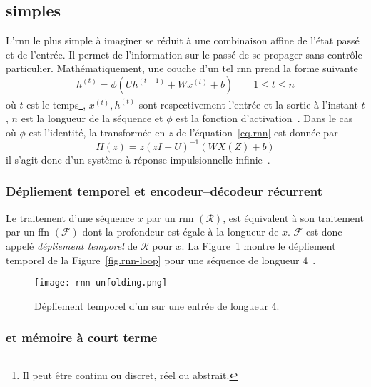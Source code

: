 \subsection{ simples}

L'\gls{rnn} le plus simple à imaginer se réduit à une combinaison affine de l'état passé et de l'entrée.
Il permet de l'information sur le passé de se propager sans contrôle particulier.
Mathématiquement, une couche d'un tel \gls{rnn} prend la forme suivante
\begin{equation}
    \label{eq.rnn}
    h^{(t)} = \phi\left(Uh^{(t-1)} + Wx^{(t)} + b\right) \qquad 1 \le t \le n
\end{equation}
où \(t\) est le temps\footnote{Il peut être continu ou discret, réel ou abstrait.},
\(x^{(t)}, h^{(t)}\) sont respectivement l'entrée et la sortie à l'instant \(t\), 
\(n\) est la longueur de la séquence et \(\phi\) est la fonction d'activation~\cite{Fathi_2021}.
Dans le cas où \(\phi\) est l'identité,  
la transformée en \(z\) de l'équation~\ref{eq.rnn} est donnée par 
\begin{equation}
    \label{eq.rnn-tz}
    H(z) = z\left(zI - U\right)^{-1} \left(WX(Z) + b\right)
\end{equation}
il s'agit donc d'un système à réponse impulsionnelle infinie~\cite{Fathi_2021}.

\subsubsection{Dépliement temporel et encodeur--décodeur récurrent}

Le traitement d'une séquence \(x\) par un \gls{rnn} \((\mathcal{R})\), 
est équivalent à son traitement par un \gls{ffn} \((\mathcal{F})\) dont la profondeur est égale à la longueur de \(x\).
\(\mathcal{F}\) est donc appelé \emph{dépliement temporel} de \(\mathcal{R}\) pour \(x\).
La Figure~\ref{fig.rnn-unfold} montre le dépliement temporel de la Figure~\ref{fig.rnn-loop} 
pour une séquence de longueur 4~\cite{LeCun_Bengio_Hinton_2015}.

\begin{figure}[hbt]
    \centering
    \texttt{[image: rnn-unfolding.png]}
    \caption{Dépliement temporel d'un  sur une entrée de longueur 4.}
    \label{fig.rnn-unfold}
\end{figure}

\subsubsection{ et mémoire à court terme}


